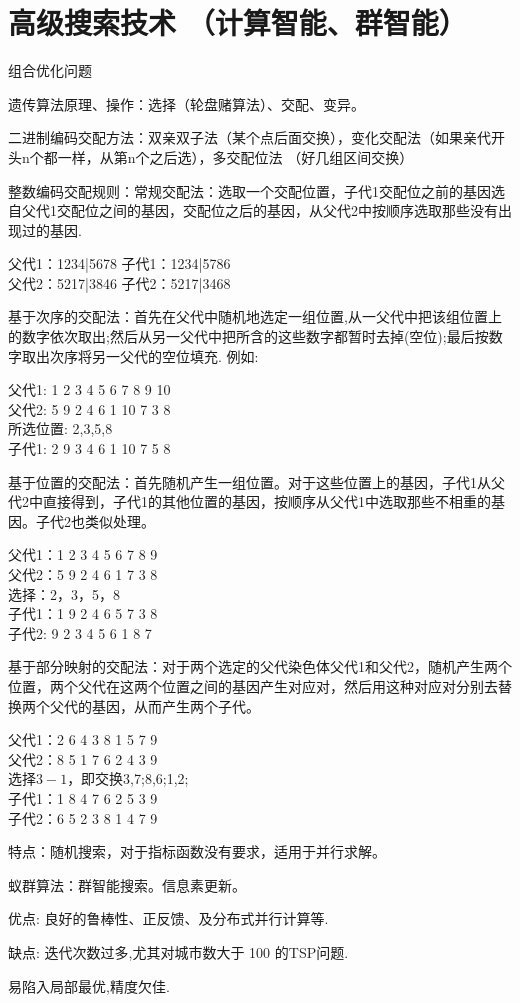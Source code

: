\documentclass[twocolumn,zihao=5,linespread=1,heading=false,autoindent=0pt]{ctexart}
\theoremstyle{exampstyle} \newtheorem{definition}{定义}[section]
\theoremstyle{exampstyle} \newtheorem{example}{例}[section]
\theoremstyle{exampstyle} \newtheorem{theorem}{定理}[section]
\theoremstyle{exampstyle} \newtheorem{lemma}{引理}[section]
\theoremstyle{exampstyle} \newtheorem{myproof}{证明}[section]
\begin{document}
\section{高级搜索技术 （计算智能、群智能）}
    组合优化问题
\begin{multicols}{2}
    遗传算法原理、操作：选择（轮盘赌算法）、交配、变异。

二进制编码交配方法：双亲双子法（某个点后面交换），变化交配法（如果亲代开头n个都一样，从第n个之后选），多交配位法 （好几组区间交换）

整数编码交配规则：常规交配法：选取一个交配位置，子代1交配位之前的基因选自父代1交配位之间的基因，交配位之后的基因，从父代2中按顺序选取那些没有出现过的基因.

父代1：1234|5678        子代1：1234|5786 \\
父代2：5217|3846        子代2：5217|3468

基于次序的交配法：首先在父代中随机地选定一组位置,从一父代中把该组位置上的数字依次取出;然后从另一父代中把所含的这些数字都暂时去掉(空位);最后按数字取出次序将另一父代的空位填充. 例如:

父代1: 1 2 3 4 5 6 7 8 9 10 \\
父代2: 5 9 2 4 6 1 10 7 3 8 \\
所选位置: 2,3,5,8 \\
子代1: 2 9 3 4 6 1 10 7 5 8
\end{multicols}
\clearpage
\begin{multicols}{2}
    基于位置的交配法：首先随机产生一组位置。对于这些位置上的基因，子代1从父代2中直接得到，子代1的其他位置的基因，按顺序从父代1中选取那些不相重的基因。子代2也类似处理。

父代1：1 2 3 4 5 6 7 8 9 \\
父代2：5 9 2 4 6 1 7 3 8 \\
选择：2，3，5，8 \\
子代1：1 9 2 4 6 5 7 3 8 \\
子代2: 9 2 3 4 5 6 1 8 7

基于部分映射的交配法：对于两个选定的父代染色体父代1和父代2，随机产生两个位置，两个父代在这两个位置之间的基因产生对应对，然后用这种对应对分别去替换两个父代的基因，从而产生两个子代。


父代1：2 6 4 3 8 1 5 7 9 \\
父代2：8 5 1 7 6 2 4 3 9 \\
选择$3 - 1$，即交换3,7;8,6;1,2; \\
子代1：1 8 4 7 6 2 5 3 9 \\
子代2：6 5 2 3 8 1 4 7 9



特点：随机搜索，对于指标函数没有要求，适用于并行求解。

蚁群算法：群智能搜索。信息素更新。

优点: 良好的鲁棒性、正反馈、及分布式并行计算等.

缺点: 迭代次数过多,尤其对城市数大于 100 的TSP问题.

易陷入局部最优,精度欠佳.
\end{multicols}
\end{document}
